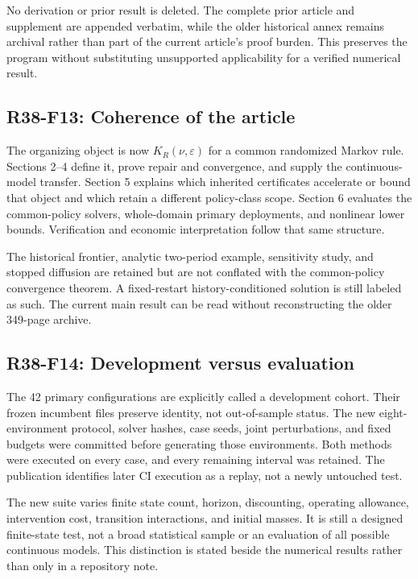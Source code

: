 No derivation or prior result is deleted. The complete prior article and supplement are appended verbatim, while the older historical annex remains archival rather than part of the current article's proof burden. This preserves the program without substituting unsupported applicability for a verified numerical result.

\subsection{R38-F13: Coherence of the article}
The organizing object is now $K_R(\nu,\varepsilon)$ for a common randomized Markov rule. Sections 2--4 define it, prove repair and convergence, and supply the continuous-model transfer. Section 5 explains which inherited certificates accelerate or bound that object and which retain a different policy-class scope. Section 6 evaluates the common-policy solvers, whole-domain primary deployments, and nonlinear lower bounds. Verification and economic interpretation follow that same structure.

The historical frontier, analytic two-period example, sensitivity study, and stopped diffusion are retained but are not conflated with the common-policy convergence theorem. A fixed-restart history-conditioned solution is still labeled as such. The current main result can be read without reconstructing the older 349-page archive.

\subsection{R38-F14: Development versus evaluation}
The 42 primary configurations are explicitly called a development cohort. Their frozen incumbent files preserve identity, not out-of-sample status. The new eight-environment protocol, solver hashes, case seeds, joint perturbations, and fixed budgets were committed before generating those environments. Both methods were executed on every case, and every remaining interval was retained. The publication identifies later CI execution as a replay, not a newly untouched test.

The new suite varies finite state count, horizon, discounting, operating allowance, intervention cost, transition interactions, and initial masses. It is still a designed finite-state test, not a broad statistical sample or an evaluation of all possible continuous models. This distinction is stated beside the numerical results rather than only in a repository note.


